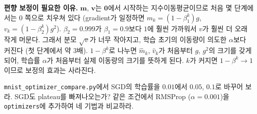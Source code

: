 \documentclass[11pt,a4paper]{article}
\begin{document}
\begin{problems}
\begin{sol}
\textbf{편향 보정이 필요한 이유.} $\bm m$, $\bm v$는 $\bm 0$에서 시작하는 지수이동평균이므로 처음 몇 단계에서는 $0$ 쪽으로 치우쳐 있다
(gradient가 일정하면 $m_k=(1-\beta_1^k)g$, $v_k=(1-\beta_2^k)g^2$).
$\beta_2=0.999$가 $\beta_1=0.9$보다 $1$에 훨씬 가까워서 $v$가 훨씬 더 오래 작게 머문다.
그래서 분모 $\sqrt{v}$가 너무 작아지고, 학습 초기의 이동량이 의도한 $\alpha$보다 커진다 (첫 단계에서 약 $3$배).
$1-\beta^k$로 나누면 $\hat m_k$, $\hat v_k$가 처음부터 $g$, $g^2$의 크기를 갖게 되어, 학습률 $\alpha$가 처음부터 실제 이동량의 크기를 뜻하게 된다.
$k$가 커지면 $1-\beta^k\to1$이므로 보정의 효과는 사라진다.
\end{sol}

\item \texttt{mnist\_optimizer\_compare.py}에서 SGD의 학습률을 $0.01$에서 $0.05$, $0.1$로 바꾸어 보라.
SGD도 plateau를 빠져나오는가? 같은 조건에서 RMSProp ($\alpha=0.001$)을 \texttt{optimizers}에 추가하여
네 기법과 비교하라.


\end{problems}
\end{document}
